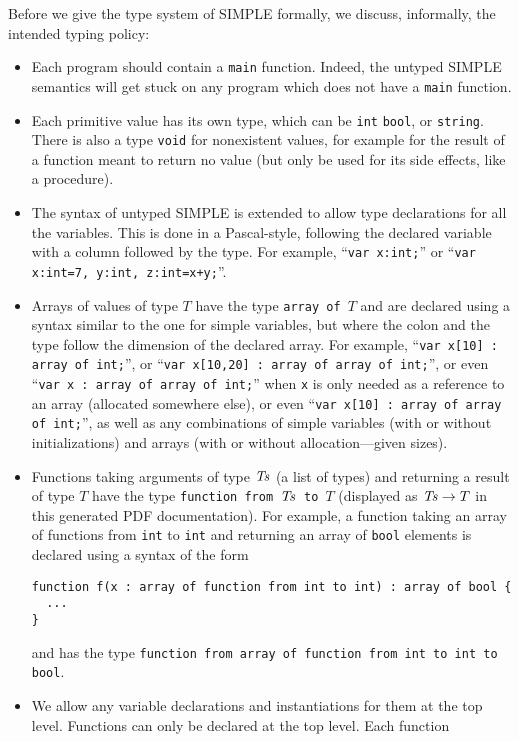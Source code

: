 \begin{latexComment}
Before we give the \K type system of SIMPLE formally, we discuss, informally,
the intended typing policy:
\begin{itemize}
\item Each program should contain a \texttt{main} function.  Indeed, the
untyped SIMPLE semantics will get stuck on any program which does not have a
\texttt{main} function.
\item Each primitive value has its own type, which can be \texttt{int}
\texttt{bool}, or \texttt{string}.  There is also a type \texttt{void} for
nonexistent values, for example for the result of a function meant to return
no value (but only be used for its side effects, like a procedure).
\item The syntax of untyped SIMPLE is extended to allow type declarations for
all the variables.  This is done in a Pascal-style, following the declared
variable with a column followed by the type.  For example,
``\texttt{var x:int;}'' or ``\texttt{var x:int=7, y:int, z:int=x+y;}''.
\item Arrays of values of type $T$ have the type \texttt{array of $T$} and
are declared using a syntax similar to the one for simple variables, but
where the colon and the type follow the dimension of the declared array.
For example, ``\texttt{var x[10] : array of int;}'', or
``\texttt{var x[10,20] : array of array of int;}'', or even
``\texttt{var x : array of array of int;}'' when \texttt{x} is only needed
as a reference to an array (allocated somewhere else), or even
``\texttt{var x[10] : array of array of int;}'', as well as any combinations of
simple variables (with or without initializations) and arrays (with or without
allocation---given sizes).
\item Functions taking arguments of type $\it Ts$ (a list of types) and
returning a result of type $T$ have the type
\texttt{function from $\it Ts$ to $T$} (displayed as ${\it Ts}\rightarrow T$
in this generated PDF documentation).  For example, a function taking an
array of functions from \texttt{int} to \texttt{int} and returning an array
of \texttt{bool} elements is declared using a syntax of the form
\begin{verbatim}
function f(x : array of function from int to int) : array of bool {
  ...
}
\end{verbatim}
and has the type
\texttt{function from array of function from int to int to bool}.
\item We allow any variable declarations and instantiations for them at the
top level.  Functions can only be declared at the top level.  Each function

\end{itemize}
\end{latexComment}
